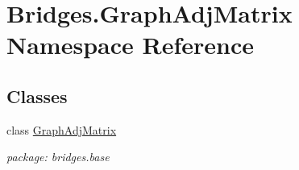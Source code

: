 \hypertarget{namespace_bridges_1_1_graph_adj_matrix}{}\section{Bridges.\+Graph\+Adj\+Matrix Namespace Reference}
\label{namespace_bridges_1_1_graph_adj_matrix}
\subsection*{Classes}
\begin{DoxyCompactItemize}
\item 
class \mbox{\hyperlink{class_bridges_1_1_graph_adj_matrix_1_1_graph_adj_matrix}{Graph\+Adj\+Matrix}}
\begin{DoxyCompactList}\small\item\em package\+: bridges.\+base \end{DoxyCompactList}\end{DoxyCompactItemize}
